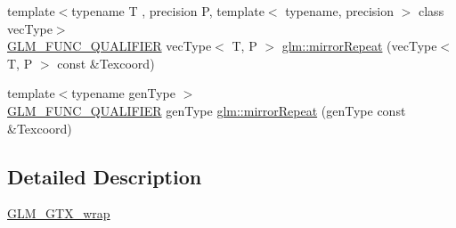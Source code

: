 \begin{DoxyCompactItemize}
\item 
{\footnotesize template$<$typename T , precision P, template$<$ typename, precision $>$ class vec\+Type$>$ }\\\mbox{\hyperlink{setup_8hpp_a33fdea6f91c5f834105f7415e2a64407}{G\+L\+M\+\_\+\+F\+U\+N\+C\+\_\+\+Q\+U\+A\+L\+I\+F\+I\+ER}} vec\+Type$<$ T, P $>$ \mbox{\hyperlink{namespaceglm_a66dd644db202199824250c457b844179}{glm\+::mirror\+Repeat}} (vec\+Type$<$ T, P $>$ const \&Texcoord)
\item 
{\footnotesize template$<$typename gen\+Type $>$ }\\\mbox{\hyperlink{setup_8hpp_a33fdea6f91c5f834105f7415e2a64407}{G\+L\+M\+\_\+\+F\+U\+N\+C\+\_\+\+Q\+U\+A\+L\+I\+F\+I\+ER}} gen\+Type \mbox{\hyperlink{group__gtx__wrap_ga16a89b0661b60d5bea85137bbae74d73}{glm\+::mirror\+Repeat}} (gen\+Type const \&Texcoord)
\end{DoxyCompactItemize}


\subsection{Detailed Description}
\mbox{\hyperlink{group__gtx__wrap}{G\+L\+M\+\_\+\+G\+T\+X\+\_\+wrap}} 